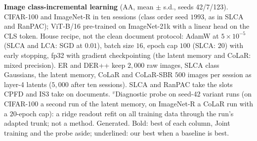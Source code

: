 \begin{table}[t]
\centering\scriptsize
\setlength{\tabcolsep}{3pt}
\caption{\textbf{Image class-incremental learning} (AA, mean $\pm$ s.d., seeds 42/7/123). CIFAR-100 and ImageNet-R in ten sessions (class order seed $1993$, as in SLCA and RanPAC); ViT-B/16 pre-trained on ImageNet-21k with a linear head on the CLS token. House recipe, not the clean document protocol: AdamW at $5{\times}10^{-5}$ (SLCA and LCA: SGD at $0.01$), batch size $16$, epoch cap $100$ (SLCA: $20$) with early stopping, fp32 with gradient checkpointing (the latent memory and CoLaR: mixed precision). ER and DER++ keep $2{,}000$ raw images, SLCA class Gaussians, the latent memory, CoLaR and CoLaR-SBR $500$ images per session as layer-4 latents ($5{,}000$ after ten sessions). SLCA and RanPAC take the slots CPFD and IS3 take on documents. $^{v}$Diagnostic probe on seed-42 variant runs (on CIFAR-100 a second run of the latent memory, on ImageNet-R a CoLaR run with a $20$-epoch cap): a ridge readout refit on all training data through the run's adapted trunk; not a method. Generated. Bold: best of each column, Joint training and the probe aside; underlined: our best when a baseline is best.}
\label{tab:image}
\resizebox{\linewidth}{!}{}
\end{table}


